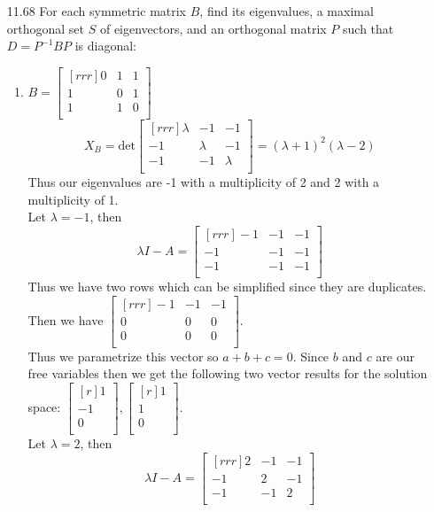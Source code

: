 \documentclass[12pt]{article}
\theoremstyle{definition}
\theoremstyle{plain}
\begin{document}
\begin{enumerate}
	
\item[11.68]For each symmetric matrix $B$, find its eigenvalues, a maximal orthogonal set $S$ of eigenvectors, and an orthogonal matrix $P$ such that $D=P^{-1}BP$ is diagonal:
	\begin{enumerate}
	\item $B=\begin{bmatrix}[rrr]0&1&1\\1&0&1\\1&1&0\\\end{bmatrix}$\\
	\[ X_B=\mathrm{det}\begin{bmatrix}[rrr]\lambda&-1&-1\\-1&\lambda&-1\\-1&-1&\lambda\\\end{bmatrix} = (\lambda+1)^2(\lambda-2) \]
	Thus our eigenvalues are -1 with a multiplicity of 2 and 2 with a multiplicity of 1.\\
	Let $\lambda=-1$, then
	\[ \lambda I - A = \begin{bmatrix}[rrr]-1&-1&-1\\-1&-1&-1\\-1&-1&-1\\\end{bmatrix} \]
	Thus we have two rows which can be simplified since they are duplicates. Then we have $\begin{bmatrix}[rrr]-1&-1&-1\\0&0&0\\0&0&0\\\end{bmatrix}$.\\
	Thus we parametrize this vector so $a+b+c=0$. Since $b$ and $c$ are our free variables then we get the following two vector results for the solution space: $\begin{bmatrix}[r]1\\-1\\0\\\end{bmatrix},\begin{bmatrix}[r]1\\1\\0\\\end{bmatrix}$.\\
	Let $\lambda=2$, then
	\[ \lambda I-A = \begin{bmatrix}[rrr]2&-1&-1\\-1&2&-1\\-1&-1&2\\\end{bmatrix} \]
	

\end{enumerate}
\end{enumerate}
\end{document}
